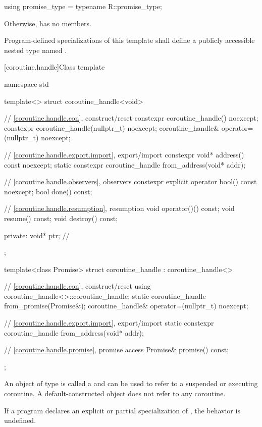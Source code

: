 \begin{codeblock}
using promise_type = typename R::promise_type;
\end{codeblock}

Otherwise,  has no members.

\pnum
Program-defined specializations of this template shall define a publicly
accessible nested type named .

[coroutine.handle]{Class template }

%
\begin{codeblock}
namespace std {
  template<>
  struct coroutine_handle<void>
  {
    // \ref{coroutine.handle.con}, construct/reset
    constexpr coroutine_handle() noexcept;
    constexpr coroutine_handle(nullptr_t) noexcept;
    coroutine_handle& operator=(nullptr_t) noexcept;

    // \ref{coroutine.handle.export.import}, export/import
    constexpr void* address() const noexcept;
    static constexpr coroutine_handle from_address(void* addr);

    // \ref{coroutine.handle.observers}, observers
    constexpr explicit operator bool() const noexcept;
    bool done() const;

    // \ref{coroutine.handle.resumption}, resumption
    void operator()() const;
    void resume() const;
    void destroy() const;

  private:
    void* ptr;  // \expos
  };

  template<class Promise>
  struct coroutine_handle : coroutine_handle<>
  {
    // \ref{coroutine.handle.con}, construct/reset
    using coroutine_handle<>::coroutine_handle;
    static coroutine_handle from_promise(Promise&);
    coroutine_handle& operator=(nullptr_t) noexcept;

    // \ref{coroutine.handle.export.import}, export/import
    static constexpr coroutine_handle from_address(void* addr);

    // \ref{coroutine.handle.promise}, promise access
    Promise& promise() const;
  };
}
\end{codeblock}

\pnum
An object of type
 is called a 
and can be used to refer to a suspended or executing coroutine.
A default-constructed  object does not refer to any
coroutine.

\pnum
If a program declares an explicit or partial specialization of
, the behavior is undefined.

